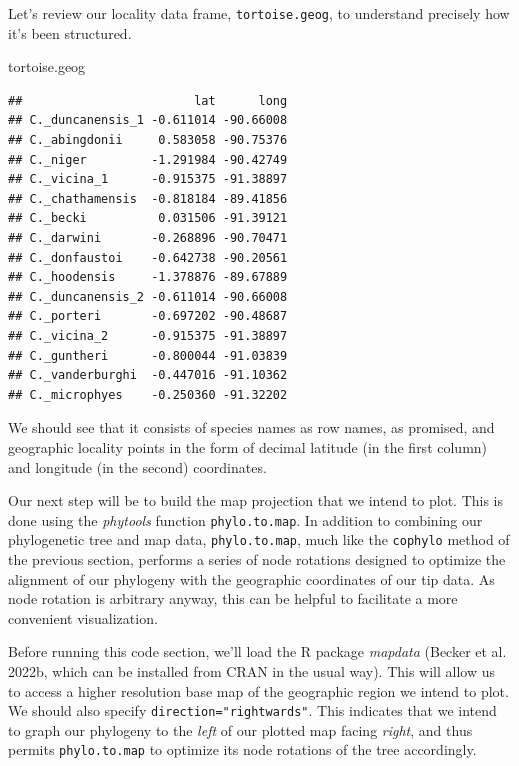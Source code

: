 \documentclass[fleqn,10pt,lineno]{wlpeerj} %
\newenvironment{Shaded}{\begin{snugshade}}{\end{snugshade}}
\newcommand{\NormalTok}[1]{#1}
\begin{document}
Let's review our locality data frame, \texttt{tortoise.geog}, to understand precisely how it's been structured.

\begin{Shaded}
\begin{Highlighting}[]
\NormalTok{tortoise.geog}
\end{Highlighting}
\end{Shaded}

\begin{verbatim}
##                        lat      long
## C._duncanensis_1 -0.611014 -90.66008
## C._abingdonii     0.583058 -90.75376
## C._niger         -1.291984 -90.42749
## C._vicina_1      -0.915375 -91.38897
## C._chathamensis  -0.818184 -89.41856
## C._becki          0.031506 -91.39121
## C._darwini       -0.268896 -90.70471
## C._donfaustoi    -0.642738 -90.20561
## C._hoodensis     -1.378876 -89.67889
## C._duncanensis_2 -0.611014 -90.66008
## C._porteri       -0.697202 -90.48687
## C._vicina_2      -0.915375 -91.38897
## C._guntheri      -0.800044 -91.03839
## C._vanderburghi  -0.447016 -91.10362
## C._microphyes    -0.250360 -91.32202
\end{verbatim}

We should see that it consists of species names as row names, as promised, and geographic locality points in the form of decimal latitude (in the first column) and longitude (in the second) coordinates.

Our next step will be to build the map projection that we intend to plot. This is done using the \emph{phytools} function \texttt{phylo.to.map}. In addition to combining our phylogenetic tree and map data, \texttt{phylo.to.map}, much like the \texttt{cophylo} method of the previous section, performs a series of node rotations designed to optimize the alignment of our phylogeny with the geographic coordinates of our tip data. As node rotation is arbitrary anyway, this can be helpful to facilitate a more convenient visualization.

Before running this code section, we'll load the R package \emph{mapdata} (Becker et al. 2022b, which can be installed from CRAN in the usual way). This will allow us to access a higher resolution base map of the geographic region we intend to plot. We should also specify \texttt{direction="rightwards"}. This indicates that we intend to graph our phylogeny to the \emph{left} of our plotted map facing \emph{right}, and thus permits \texttt{phylo.to.map} to optimize its node rotations of the tree accordingly.
\end{document}
